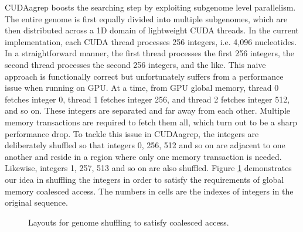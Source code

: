 CUDAagrep boosts the searching step by exploiting subgenome level parallelism. The entire genome is first equally divided into multiple subgenomes, which are then distributed across a 1D domain of lightweight CUDA threads. In the current implementation, each CUDA thread processes 256 integers, i.e. 4,096 nucleotides. In a straightforward manner, the first thread processes the first 256 integers, the second thread processes the second 256 integers, and the like. This naive approach is functionally correct but unfortunately suffers from a performance issue when running on GPU. At a time, from GPU global memory, thread 0 fetches integer 0, thread 1 fetches integer 256, and thread 2 fetches integer 512, and so on. These integers are separated and far away from each other. Multiple memory transactions are required to fetch them all, which turn out to be a sharp performance drop. To tackle this issue in CUDAagrep, the integers are deliberately shuffled so that integers 0, 256, 512 and so on are adjacent to one another and reside in a region where only one memory transaction is needed. Likewise, integers 1, 257, 513 and so on are also shuffled. Figure \ref{fig:GenomeShuffling} demonstrates our idea in shuffling the integers in order to satisfy the requirements of global memory coalesced access. The numbers in cells are the indexes of integers in the original sequence.

\begin{figure}[t]
\centering
{}
\caption{Layouts for genome shuffling to satisfy coalesced access.}
\label{fig:GenomeShuffling}
\end{figure}

